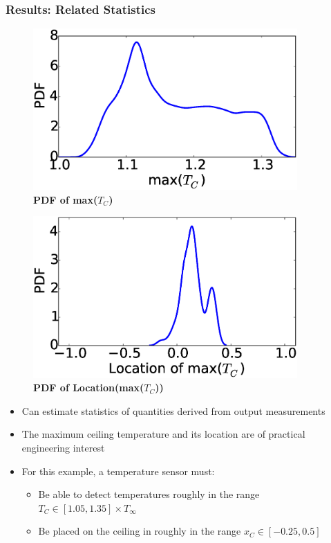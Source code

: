 \documentclass[9pt]{beamer}
\begin{document}
\begin{frame}
\frametitle{Results: Related Statistics}
\label{sec-7-6}


\centering
\begin{minipage}[b]{0.45\linewidth}
\begin{figure}[ht]
\includegraphics[width=0.9\textwidth]{maxCeilingTempDistribution} \\
\textbf{PDF of max($T_C$)}
\end{figure}
\end{minipage}
\begin{minipage}[b]{0.45\linewidth}
\begin{figure}[ht]
\includegraphics[width=0.9\textwidth]{maxCeilingTempLocationDistribution} \\
\textbf{PDF of Location(max($T_C$))}
\end{figure}
\end{minipage}

\begin{itemize}
\item Can estimate statistics of quantities derived from output measurements
\item The maximum ceiling temperature and its location are of practical engineering interest
\item For this example, a temperature sensor must:
\begin{itemize}
\item Be able to detect temperatures roughly in the range $T_C \in [1.05,1.35] \times T_{\infty}$
\item Be placed on the ceiling in roughly in the range $x_C \in [-0.25, 0.5]$
\end{itemize}
\end{itemize}
\end{frame}
\end{document}
